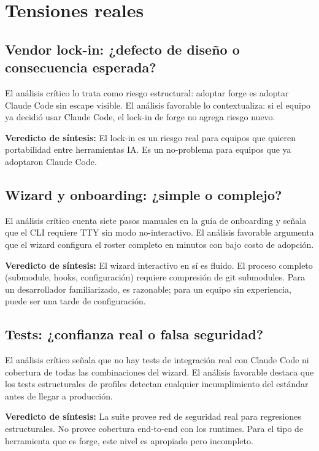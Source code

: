 \documentclass[12pt,a4paper]{article}
\begin{document}
\section{Tensiones reales}

\subsection{Vendor lock-in: ¿defecto de diseño o consecuencia esperada?}

El an\'alisis cr\'itico lo trata como riesgo estructural: adoptar forge es adoptar Claude Code sin escape visible. El an\'alisis favorable lo contextualiza: si el equipo ya decidi\'o usar Claude Code, el lock-in de forge no agrega riesgo nuevo.

\textbf{Veredicto de s\'intesis:} El lock-in es un riesgo real para equipos que quieren portabilidad entre herramientas IA. Es un no-problema para equipos que ya adoptaron Claude Code.

\subsection{Wizard y onboarding: ¿simple o complejo?}

El an\'alisis cr\'itico cuenta siete pasos manuales en la gu\'ia de onboarding y se\~nala que el CLI requiere TTY sin modo no-interactivo. El an\'alisis favorable argumenta que el wizard configura el roster completo en minutos con bajo costo de adopci\'on.

\textbf{Veredicto de s\'intesis:} El wizard interactivo en s\'i es fluido. El proceso completo (submodule, hooks, configuraci\'on) requiere compresi\'on de git submodules. Para un desarrollador familiarizado, es razonable; para un equipo sin experiencia, puede ser una tarde de configuraci\'on.

\subsection{Tests: ¿confianza real o falsa seguridad?}

El an\'alisis cr\'itico se\~nala que no hay tests de integraci\'on real con Claude Code ni cobertura de todas las combinaciones del wizard. El an\'alisis favorable destaca que los tests estructurales de profiles detectan cualquier incumplimiento del est\'andar antes de llegar a producci\'on.

\textbf{Veredicto de s\'intesis:} La suite provee red de seguridad real para regresiones estructurales. No provee cobertura end-to-end con los runtimes. Para el tipo de herramienta que es forge, este nivel es apropiado pero incompleto.
\end{document}
